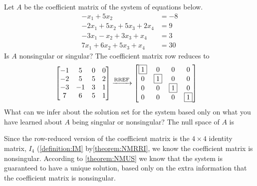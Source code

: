 \documentclass{ximera}
\begin{document}
\begin{exercise}
  Let $A$ be the coefficient matrix of the system of equations below.
  \begin{align*}
    -x_1+5x_2&=-8\\
    -2x_1+5x_2+5x_3+2x_4&=9\\
    -3x_1-x_2+3x_3+x_4&=3\\
    7x_1+6x_2+5x_3+x_4&=30
  \end{align*}
  Is $A$ nonsingular or singular?
  The coefficient matrix row reduces to
  \begin{align*}
    \begin{bmatrix}
      -1 & 5 & 0 & 0  \\
      -2 & 5 & 5 & 2  \\
      -3 & -1 & 3 & 1  \\
      7 & 6 & 5 & 1
    \end{bmatrix}
         &\xrightarrow{\text{RREF}}
           \begin{bmatrix}
             \fbox{1} & 0 & 0 & 0  \\
             0 & \fbox{1} & 0 & 0  \\
             0 & 0 & \fbox{1} & 0  \\
             0 & 0 & 0 & \fbox{1}
           \end{bmatrix}
  \end{align*}
  What can we infer about the solution set for the system based only on what you have learned about $A$ being singular or nonsingular?  The null space of $A$ is
  \begin{multipleChoice}
  \end{multipleChoice}

  \begin{feedback}[correct]
    Since the row-reduced version of the coefficient matrix is the
    $4\times 4$ identity matrix, $I_4$ (\ref{definition:IM}
    by\ref{theorem:NMRRI}, we know the coefficient matrix is
    nonsingular.  According to \ref{theorem:NMUS} we know that the
    system is guaranteed to have a unique solution, based only on the
    extra information that the coefficient matrix is nonsingular.
  \end{feedback}
\end{exercise}
\end{document}
